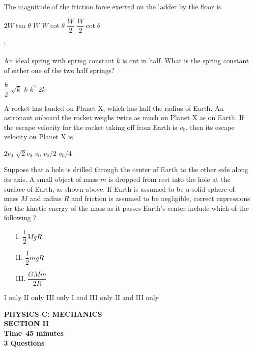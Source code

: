 \documentclass[12pt]{exam}
\begin{document}
\begin{questions}
  \question The magnitude of the friction force exerted on the ladder by the
  floor is
  \begin{choices}
    \choice $2W\tan\theta$
    \choice $W$
    \choice $W\cot\theta$
    \choice $\dfrac W2$
    \choice $\dfrac W2\cot\theta$
  \end{choices}
  \label{ladder2}`
  
  \question An ideal spring with spring constant $k$ is cut in half. What is the
  spring constant of either one of the two half springs?
  \begin{choices}
    \choice $\dfrac k2$
    \choice $\sqrt k$
    \choice $k$
    \choice $k^2$
    \choice $2k$
  \end{choices}

  \question A rocket has landed on Planet X, which has half the radius of
  Earth. An astronaut onboard the rocket weighs twice as much on Planet X as on
  Earth. If the escape velocity for the rocket taking off from Earth is $v_0$,
  then its escape velocity on Planet X is
  \begin{choices}
    \choice $2v_0$
    \choice $\sqrt2 v_0$
    \choice $v_0$
    \choice $v_0/2$
    \choice $v_0/4$
  \end{choices}
  
  \begin{center}
  \end{center}
  
  \question Suppose that a hole is drilled through the center of Earth to the
  other side along its axis. A small object of mass $m$ is dropped from rest
  into the hole at the surface of Earth, as shown above. If Earth is assumed to
  be a solid sphere of mass $M$ and radius $R$ and friction is assumed to be
  negligible, correct expressions for the kinetic energy of the mass as it
  passes Earth's center include which of the following ?
  \begin{enumerate}[topsep=0pt,itemsep=3pt]
  \item[I.] $\dfrac12MgR$
  \item[II.] $\dfrac12mgR$
  \item[III.] $\dfrac{GMm}{2R}$
  \end{enumerate}
  \begin{choices}
    \choice I only
    \choice II only
    \choice III only
    \choice I and III only
    \choice II and III only
  \end{choices}
\end{questions}
\newpage

\begin{center}
  \textbf{
    PHYSICS C: MECHANICS\\
    SECTION II\\
    Time--45 minutes\\
    3 Questions
  }
\end{center}
\end{document}

